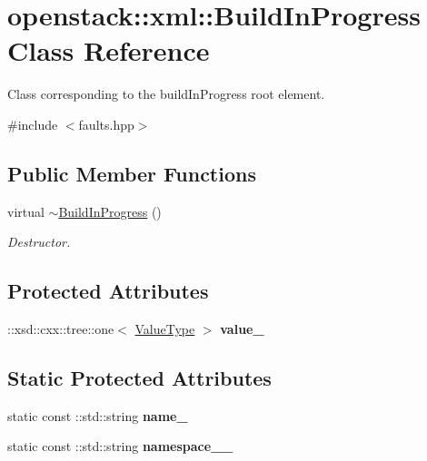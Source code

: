 \hypertarget{classopenstack_1_1xml_1_1BuildInProgress}{
\section{openstack::xml::BuildInProgress Class Reference}
\label{classopenstack_1_1xml_1_1BuildInProgress}
}


Class corresponding to the buildInProgress root element.  




{\ttfamily \#include $<$faults.hpp$>$}

\subsection*{Public Member Functions}
\begin{DoxyCompactItemize}
\item 
\hypertarget{classopenstack_1_1xml_1_1BuildInProgress_a9791c22ba9f0bba2d250d891c58104e4}{
virtual \hyperlink{classopenstack_1_1xml_1_1BuildInProgress_a9791c22ba9f0bba2d250d891c58104e4}{$\sim$BuildInProgress} ()}
\label{classopenstack_1_1xml_1_1BuildInProgress_a9791c22ba9f0bba2d250d891c58104e4}

\begin{DoxyCompactList}\small\item\em Destructor. \item\end{DoxyCompactList}\end{DoxyCompactItemize}
\subsection*{Protected Attributes}
\begin{DoxyCompactItemize}
\item 
\hypertarget{classopenstack_1_1xml_1_1BuildInProgress_ae40c04ae177faf2c955e283c14a5e163}{
::xsd::cxx::tree::one$<$ \hyperlink{classopenstack_1_1xml_1_1BuildInProgressAPIFault}{ValueType} $>$ {\bfseries value\_\-}}
\label{classopenstack_1_1xml_1_1BuildInProgress_ae40c04ae177faf2c955e283c14a5e163}

\end{DoxyCompactItemize}
\subsection*{Static Protected Attributes}
\begin{DoxyCompactItemize}
\item 
\hypertarget{classopenstack_1_1xml_1_1BuildInProgress_a8bdeb2bf7c15780dccd0ced0f3a44c14}{
static const ::std::string {\bfseries name\_\-}}
\label{classopenstack_1_1xml_1_1BuildInProgress_a8bdeb2bf7c15780dccd0ced0f3a44c14}

\item 
\hypertarget{classopenstack_1_1xml_1_1BuildInProgress_a0e98e8851fee0ae3484b74aa1e263480}{
static const ::std::string {\bfseries namespace\_\-\_\-}}
\label{classopenstack_1_1xml_1_1BuildInProgress_a0e98e8851fee0ae3484b74aa1e263480}

\end{DoxyCompactItemize}

